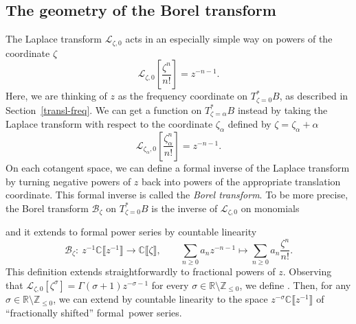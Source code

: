 \documentclass[pdftex]{sigma}
\newcommand{\maps}{\colon}
\newcommand{\Z}{\mathbb{Z}}
\newcommand{\R}{\mathbb{R}}
\newcommand{\C}{\mathbb{C}}
\newcommand{\laplace}{\mathcal{L}}
\newcommand{\borel}{\mathcal{B}}
\numberwithin{equation}{section}
\begin{document}
\subsection{The geometry of the Borel transform}\label{sec:geometry_borel}
The Laplace transform $\laplace_{\zeta, 0}$ acts in an especially simple way on powers of the coordinate $\zeta$
\[ \laplace_{\zeta, 0}\left[\frac{\zeta^n}{n!}\right] = z^{-n-1}. \]
Here, we are thinking of $z$ as the frequency coordinate on $T^*_{\zeta = 0}B$, as described in Section~\ref{transl-freq}. We can get a function on $T^*_{\zeta = \alpha}B$ instead by taking the Laplace transform with respect to the coordinate $\zeta_\alpha$ defined by $\zeta = \zeta_\alpha + \alpha$
\[ \laplace_{\zeta_\alpha, 0}\left[\frac{\zeta_\alpha^n}{n!}\right] = z^{-n-1}. \]
On each cotangent space, we can define a formal inverse of the Laplace transform by turning negative powers of $z$ back into powers of the appropriate translation coordinate. This formal inverse is called the {\em Borel transform}. To be more precise, the Borel transform $\borel_\zeta$ on $T^*_{\zeta = 0}B$ is the inverse of $\laplace_{\zeta,0}$ on monomials
\begin{center}
\end{center}
and it extends to formal power series by countable linearity
\begin{equation*}
\borel_\zeta \maps\ z^{-1} \C \big\llbracket z^{-1} \big\rrbracket \to \C \llbracket \zeta \rrbracket ,\qquad
\sum_{n \ge 0} a_n z^{-n-1} \mapsto \sum_{n \ge 0} a_n \frac{\zeta^n}{n!}.
\end{equation*}
This definition extends straightforwardly to fractional powers of $z$. Observing that
$\laplace_{\zeta,0}[\zeta^\sigma]=\Gamma(\sigma+1)z^{-\sigma-1}$
for every $\sigma \in \R \setminus \Z_{\leq 0}$, we define
\smash{$
\borel_\zeta\bigl[z^{-\sigma-1}\bigr] := \frac{\zeta^{\sigma}}{\Gamma(\sigma+1)}$}.
Then, for any $\sigma \in \R \setminus \Z_{\leq 0}$, we can extend by countable linearity to the space $z^{-\sigma}\C\big\llbracket z^{-1}\big\rrbracket$ of ``fractionally shifted'' formal~power series.
\end{document}

